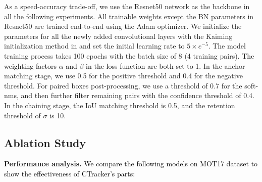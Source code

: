 \documentclass[../arXiv_main.tex]{subfiles}
\newcommand\wca[1]{\textcolor{black}{#1}}
\newcommand\CRwfb[1]{\textcolor{black}{#1}}
\newcommand{\CRyang}[1]{\textcolor{black}{#1}}
\begin{document}
As a speed-accuracy trade-off, we use the Resnet50 \cite{he2016deep} network as the backbone in all the following experiments. All trainable weights except the BN parameters in Resnet50 are trained end-to-end using \CRwfb{the} Adam optimizer. We initialize the parameters for all the newly added convolutional layers with the Kaiming initialization method in \cite{he2015delving} and set the initial learning rate to $5\times e^{-5}$. The model training process takes 100 epochs with the batch size of 8 (4 training pairs). \CRyang{The weighting factors $\alpha$ and $\beta$ in the loss function are both set to 1. }In the anchor matching stage, we use 0.5 for the positive threshold and 0.4 for the negative threshold. For paired boxes post-processing, we use a threshold of 0.7 for the soft-nms, and then further filter remaining pairs with the confidence threshold of 0.4. In the chaining stage, the IoU matching threshold is 0.5, and the retention threshold of $\sigma$ is 10. 


\begin{table}[t!]
\renewcommand\arraystretch{1.2}
\centering

\caption{\textbf{Ablation study on MOT17 test dataset}.}\label{tab:tab1}
\scriptsize{
}
\end{table}

\subsection{Ablation Study}

\noindent\textbf{Performance analysis.} \wca{We \CRyang{compare} the following \CRyang{models on MOT17 dataset to show} the effectiveness of \CRyang{CTracker's} parts:}
\end{document}
